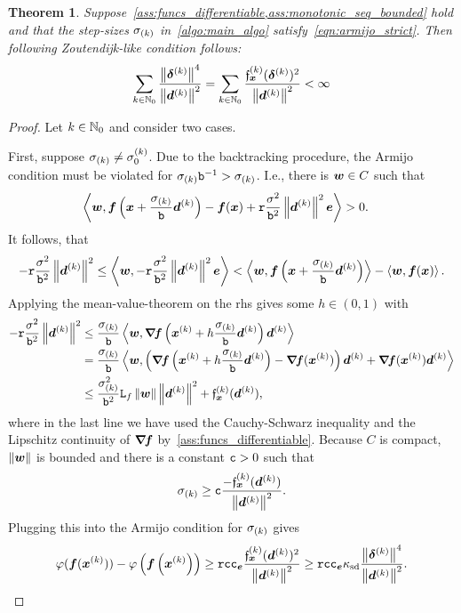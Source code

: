 \documentclass{article}
\theoremstyle{plain}
\newtheorem{theorem}{Theorem}
\theoremstyle{definition}
\begin{document}
\begin{theorem}%
	\label{thm:armijoZoutendijk}
	Suppose~\cref{ass:funcs_differentiable,ass:monotonic_seq_bounded} hold
	and that the step-sizes $\sigma_{(k)}$ in~\cref{algo:main_algo}
	satisfy~\cref{eqn:armijo_strict}.  
	Then following Zoutendijk-like condition follows:
	\begin{equation}
		\sum_{k \in \mathbb N_0}
		\frac{
			\left\|\bm{\delta}^{(k)}\right\|^4
		}{
			\left\|\bm{d}^{(k)}\right\|^2
		}
		=
		\sum_{k \in \mathbb N_0}
		\frac{
			\mathfrak{f}_{\bm{x}}^{(k)}(\bm{\delta}^{(k)})^2
		}{
			\left\|\bm{d}^{(k)}\right\|^2
		}
		<
		\infty
	\end{equation}
\end{theorem}
\begin{proof}
	Let $k\in\mathbb N_0$ and consider two cases.

	First, suppose $\sigma_{(k)}\ne\sigma^{(k)}_{0}$.
	Due to the backtracking procedure, the Armijo condition must be violated 
	for $\sigma_{(k)} \mathtt{b}^{-1} > \sigma_{(k)}$.
	I.e., there is $\bm{w}\in C$ such that 
	\begin{align*}
		\left\langle 
			\bm{w}
		, 
			\bm{f}\left(\bm{x} + \frac{\sigma_{(k)}}{\mathtt{b}}\bm{d}^{(k)}\right)
			-
			\bm{f}(\bm{x})
			+ 
			\mathtt{r} \frac{\sigma^2}{\mathtt{b}^2} \left\|\bm{d}^{(k)}\right\|^2 \bm{e}
		 \right\rangle
	&
	> 
		0.
	\end{align*}
	It follows, that
	\begin{align*}
	-\armijoConst \frac{\sz^2}{\armijoFactor^2} \norm{\vdK}^2
	\leq
	\mul{
		\ve w
	}{
		-\armijoConst \frac{\sz^2}{\armijoFactor^2} \norm{\vdK}^2 \ve{e}
	}
	<
	\mul{
			\ve w
		}{
			\vf\args{\vx + \frac{\szK}{\armijoFactor}\vdK}
		}
		-
		\mul{
			\ve w
		}{%
			\vf(\vx)
		}.
	\end{align*}
	Applying the mean-value-theorem on the \ac{rhs}
	gives some 
	$h \in (0,1)$ with
	\begin{align*}	
		-\mathtt{r} \frac{\sigma^2}{\mathtt{b}^2} \left\|\bm{d}^{(k)}\right\|^2
		&\leq
		\frac{\sigma_{(k)}}{\mathtt{b}}
		\left\langle 
			\bm{w}
		, 
			\bm{\nabla}\!\bm{f}\left(\bm{x}^{(k)} + h \frac{\sigma_{(k)}}{\mathtt{b}}\bm{d}^{(k)}\right)\bm{d}^{(k)}
		 \right\rangle
		\\
		&=
		\frac{\sigma_{(k)}}{\mathtt{b}}
		\left\langle 
			\bm{w}
		, 
			\left(
				\bm{\nabla}\!\bm{f}\left(\bm{x}^{(k)} + h \frac{\sigma_{(k)}}{\mathtt{b}}\bm{d}^{(k)}\right)
				-
				\bm{\nabla}\!\bm{f}(\bm{x}^{(k)})
			\right)\bm{d}^{(k)}
			+ 
			\bm{\nabla}\!\bm{f}(\bm{x}^{(k)})\bm{d}^{(k)}
		 \right\rangle
		\\
		&\leq
		\frac{\sigma_{(k)}^2}{\mathtt{b}^2}
		\mathtt{L}_{f}
		\left\|\bm{w}\right\|\left\|\bm{d}^{(k)}\right\|^2 
		+ 
		\mathfrak{f}_{\bm{x}}^{(k)}(\bm{d}^{(k)}),
	\end{align*}
	where in the last line we have used the Cauchy-Schwarz inequality
	and the Lipschitz continuity of $\bm{\nabla}\!\bm{f}$ by~\cref{ass:funcs_differentiable}.
	Because $C$ is compact, $\left\|\bm{w}\right\|$ is bounded and there is a constant
	$\mathtt c > 0$ such that
	$$
	\sigma_{(k)}\ge \mathtt c \frac{-\mathfrak{f}_{\bm{x}}^{(k)}(\bm{d}^{(k)})}{\left\|\bm{d}^{(k)}\right\|^2}.
	$$
	Plugging this into the Armijo condition for $\sigma_{(k)}$ gives
	\begin{equation}	
	\varphi(\bm{f}(\bm{x}^{(k)}))
	-
	\varphi\left(\bm{f}\left(\bm{x}^{(k)}\right)\right)
	\geq 
	\mathtt{r}
	\mathtt c
	\mathtt{c}_{\bm{e}}
	\frac{
		\mathfrak{f}_{\bm{x}}^{(k)}(\bm{d}^{(k)})^2
	}{
		\left\|\bm{d}^{(k)}\right\|^2
	}
	\geq 
	\mathtt{r}
	\mathtt c
	\mathtt{c}_{\bm{e}}
	\kappa_{\mathrm{sd}}
	\frac{
		\left\|\bm{\delta}^{(k)}\right\|^4
	}{
		\left\|\bm{d}^{(k)}\right\|^2
	}.
	\label{eqn:untuningCreatrixes}
	\end{equation}


\end{proof}
\end{document}
